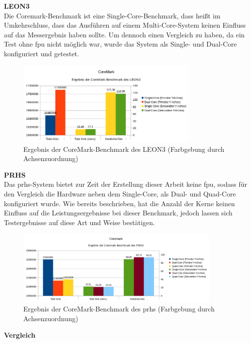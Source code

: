 \newpage

\textbf{LEON3}\\
Die Coremark-Benchmark ist eine Single-Core-Benchmark, dass heißt im Umkehrschluss, dass das Ausführen auf einem Multi-Core-System keinen Einfluss auf das Messergebnis haben sollte.
Um dennoch einen Vergleich zu haben, da ein Test ohne \ac{fpu} nicht möglich war, wurde das System als Single- und Dual-Core konfiguriert und getestet.

\begin{figure}[H]
\centering
\includegraphics[width=0.8\textwidth]{Hauptteil/coremarkleon3.png}
\caption{Ergebnis der CoreMark-Benchmark des LEON3 (Farbgebung durch Achsenzuordnung)}
\label{fig:coremarkleon3}
\end{figure}


\textbf{PRHS}\\
Das \ac{prhs}-System bietet zur Zeit der Erstellung dieser Arbeit keine \ac{fpu}, sodass für den Vergleich die Hardware neben dem Single-Core, als Dual- und Quad-Core konfiguriert wurde.
Wie bereits beschrieben, hat die Anzahl der Kerne keinen Einfluss auf die Leistungsergebnisse bei dieser Benchmark, jedoch lassen sich Testergebnisse auf diese Art und Weise bestätigen.
\begin{figure}[H]
\centering
\includegraphics[width=0.9\textwidth]{Hauptteil/coremarkprhs.png}
\caption{Ergebnis der CoreMark-Benchmark des \ac{prhs} (Farbgebung durch Achsenzuordnung)}
\label{fig:coremarkprhs}
\end{figure}


\textbf{Vergleich}

